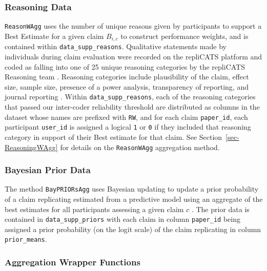 \documentclass[article]{jss}
\begin{document}
\hypertarget{sec-reasonwagg-supplementary-data}{%
\subsubsection{Reasoning Data}\label{sec-reasonwagg-supplementary-data}}

\texttt{ReasonWAgg} uses the number of unique reasons given by
participants to support a Best Estimate for a given claim \(B_{i,c}\) to
construct performance weights, and is contained within
\texttt{data\_supp\_reasons}. Qualitative statements made by individuals
during claim evaluation were recorded on the repliCATS platform
\citep{Pearson2021} and coded as falling into one of 25 unique reasoning
categories by the repliCATS Reasoning team \citep{Wintle:2021}.
Reasoning categories include plausibility of the claim, effect size,
sample size, presence of a power analysis, transparency of reporting,
and journal reporting \citep{Hanea2021}. Within
\texttt{data\_supp\_reasons}, each of the reasoning categories that
passed our inter-coder reliability threshold are distributed as columns
in the dataset whose names are prefixed with \texttt{RW}, and for each
claim \texttt{paper\_id}, each participant \texttt{user\_id} is assigned
a logical \texttt{1} or \texttt{0} if they included that reasoning
category in support of their Best estimate for that claim. See
Section~\ref{sec-ReasoningWAgg} for details on the \texttt{ReasonWAgg}
aggregation method.

\hypertarget{sec-bayesian-supplementary-data}{%
\subsubsection{Bayesian Prior
Data}\label{sec-bayesian-supplementary-data}}

The method \texttt{BayPRIORsAgg} uses Bayesian updating to update a
prior probability of a claim replicating estimated from a predictive
model \citep{Gould2021a} using an aggregate of the best estimates for
all participants assessing a given claim \(c\) \citep{Hanea2021}. The
prior data is contained in \texttt{data\_supp\_priors} with each claim
in column \texttt{paper\_id} being assigned a prior probability (on the
logit scale) of the claim replicating in column \texttt{prior\_means}.

\hypertarget{aggregation-wrapper-functions}{%
\subsubsection{Aggregation Wrapper
Functions}\label{aggregation-wrapper-functions}}
\end{document}
